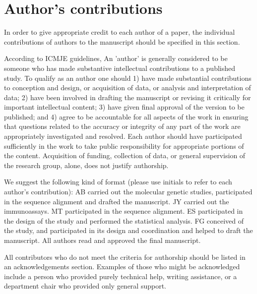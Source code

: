 \section{Author's contributions}

In order to give appropriate credit to each author of a paper, the individual contributions of authors to the manuscript should be specified in this section.

According to ICMJE guidelines, An 'author' is generally considered to be someone who has made substantive intellectual contributions to a published study. To qualify as an author one should 1) have made substantial contributions to conception and design, or acquisition of data, or analysis and interpretation of data; 2) have been involved in drafting the manuscript or revising it critically for important intellectual content; 3) have given final approval of the version to be published; and 4) agree to be accountable for all aspects of the work in ensuring that questions related to the accuracy or integrity of any part of the work are appropriately investigated and resolved. Each author should have participated sufficiently in the work to take public responsibility for appropriate portions of the content. Acquisition of funding, collection of data, or general supervision of the research group, alone, does not justify authorship.

We suggest the following kind of format (please use initials to refer to each author's contribution): AB carried out the molecular genetic studies, participated in the sequence alignment and drafted the manuscript. JY carried out the immunoassays. MT participated in the sequence alignment. ES participated in the design of the study and performed the statistical analysis. FG conceived of the study, and participated in its design and coordination and helped to draft the manuscript. All authors read and approved the final manuscript.

All contributors who do not meet the criteria for authorship should be listed in an acknowledgements section. Examples of those who might be acknowledged include a person who provided purely technical help, writing assistance, or a department chair who provided only general support.
